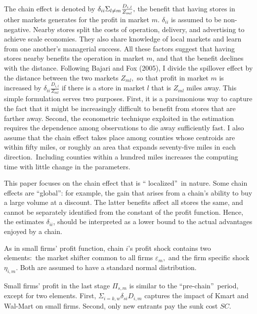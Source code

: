 \documentclass[notitlepage,onecolumn,11pt]{article}
\begin{document}
The chain effect is denoted by $\delta _{ii}\Sigma _{l\neq m}\frac{D_{i,l}}{%
Z_{ml}},$ the benefit that having stores in other markets generates for the
profit in market $m.$ $\delta _{ii}$ is assumed to be non-negative. Nearby
stores split the costs of operation, delivery, and advertising to achieve
scale economies. They also share knowledge of local markets and learn from
one another's managerial success. All these factors suggest that having
stores nearby benefits the operation in market $m$, and that the benefit
declines with the distance. Following Bajari and Fox (2005), I divide the
spillover effect by the distance between the two markets $Z_{ml},$ so that
profit in market $m$ is increased by $\delta _{ii}\frac{D_{i,l}}{Z_{ml}}$ if
there is a store in market $l$ that is $Z_{ml}$ miles away. This simple
formulation serves two purposes. First, it is a parsimonious way to capture
the fact that it might be increasingly difficult to benefit from stores that
are farther away. Second, the econometric technique exploited in the
estimation requires the dependence among observations to die away
sufficiently fast. I also assume that the chain effect takes place among
counties whose centroids are within fifty miles, or roughly an area that
expands seventy-five miles in each direction.\ Including counties within a
hundred miles increases the computing time with little change in the
parameters.

This paper focuses on the chain effect that is \textquotedblleft
localized\textquotedblright\ in nature. Some chain effects are
\textquotedblleft global\textquotedblright : for example, the gain that
arises from a chain's ability to buy a large volume at a discount. The
latter benefits affect all stores the same, and cannot be separately
identified from the constant of the profit function. Hence, the estimates $%
\delta _{ii}$, should be interpreted as a lower bound to the actual
advantages enjoyed by a chain.

As in small firms' profit function, chain $i$'s profit shock contains two
elements:\ the market shifter common to all firms $\varepsilon _{m},$ and
the firm specific shock $\eta _{i,m}$. Both are assumed to have a standard
normal distribution.

Small firms' profit in the last stage $\Pi _{s,m}$ is similar to the
\textquotedblleft pre-chain\textquotedblright\ period, except for two
elements. First, $\Sigma _{i=k,w}\delta _{si}D_{i,m}$ captures the impact of
Kmart and Wal-Mart on small firms. Second, only new entrants pay the sunk
cost $SC$.
\end{document}

